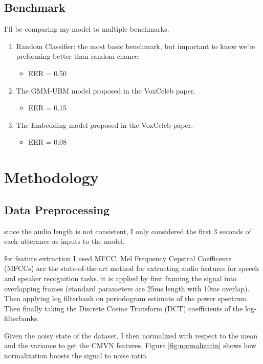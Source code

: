 \documentclass{article}
\begin{document}
\subsection{Benchmark}

I'll be comparing my model to multiple benchmarks.

\begin{enumerate}
    \item Random Classifier: the most basic benchmark, but important to know we're preforming better than random chance.
    \begin{itemize}
        \item EER = 0.50
    \end{itemize}
    \item The GMM-UBM model proposed in the VoxCeleb paper.
    \begin{itemize}
        \item EER = 0.15
    \end{itemize}    
    \item The Embedding model proposed in the VoxCeleb paper.
    \begin{itemize}
        \item EER = 0.08
    \end{itemize}
\end{enumerate}

\section{Methodology}
\subsection{Data Preprocessing}
since the audio length is not consistent, I only considered the first 3 seconds of each utterance as inputs to the model. 

for feature extraction I used MFCC. Mel Frequency Cepstral Coefficents (MFCCs) are the state-of-the-art method for extracting audio features for speech and speaker recognition tasks. it is applied by first framing the signal into overlapping frames (standard parameters are 25ms length with 10ms overlap). Then applying log filterbank on periodogram estimate of the power spectrum. Then finally taking the Discrete Cosine Transform (DCT) coefficients of the log-filterbanks.\cite{jlyon}

Given the noisy state of the dataset, I then normalized with respect to the mean and the variance to get the CMVN features, Figure \ref{fig:normalizatin} shows how normalization boosts the signal to noise ratio.
\end{document}
